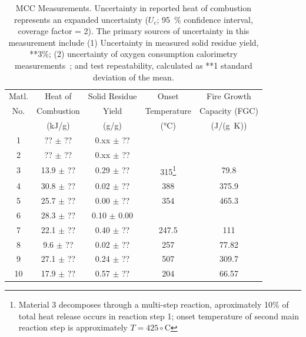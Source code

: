 \documentclass[12pt]{article}
\begin{document}
\begin{table}
\begin{center}
\caption[MCC Measurements]{MCC Measurements. Uncertainty in reported heat of combustion represents an expanded uncertainty ($U_c$; 95~\% confidence interval, coverage factor = 2).  The primary sources of uncertainty in this measurement include (1) Uncertainty in measured solid residue yield, **3\%; (2) uncertainty of oxygen consumption calorimetry measurements~\cite{Huggett:1}; and test repeatability, calculated as **1 standard deviation of the mean.}
\label{MCC}
\begin{tabular}{ccccc}
\hline
Matl.  & Heat of        & Solid Residue    & Onset              & Fire Growth                   \\
No.    & Combustion     & Yield            & Temperature        & Capacity (FGC)          \\
       & (kJ/g)         & (g/g)            & (°C)               & (J/(g~K))    \\
\hline
1      &  ?? $\pm$ ??   & 0.xx $\pm$ ??    &                    &              \\
2      &  ?? $\pm$ ??   & 0.xx $\pm$ ??    &                    &              \\
3      &  13.9 $\pm$ ?? & 0.29 $\pm$ ??    &      315\footnote{Material 3 decomposes through a multi-step reaction, aproximately 10\% of total heat release occurs in reaction step 1; onset temperature of second main reaction step is approximately $T = 425\circ$C}     	& 79.8             \\
4      &  30.8 $\pm$ ?? & 0.02 $\pm$ ??    &     388         	& 375.9             \\
5      &  25.7 $\pm$ ?? & 0.00 $\pm$ ??    &       354             &       465.3       \\
6      &  28.3 $\pm$ ?? & 0.10 $\pm$ 0.00  &                    &              \\
7      &  22.1 $\pm$ ?? & 0.40 $\pm$ ??    &         247.5           &  111            \\
8      &  9.6 $\pm$ ??  & 0.02 $\pm$ ??    &        257            &   77.82           \\
9      &  27.1 $\pm$ ?? & 0.24 $\pm$ ??    &       507             & 309.7             \\
10     &  17.9 $\pm$ ?? & 0.57 $\pm$ ??    &       204             &  66.57            \\
\hline
\end{tabular}
\end{center}
\end{table}
\end{document}
